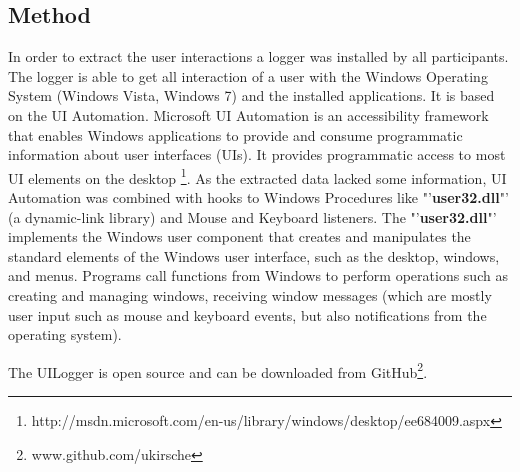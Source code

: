 \subsection{Method}
\label{habits_method}
In order to extract the user interactions a logger was installed by all participants. The logger is able to get all interaction of a user with the Windows Operating System (Windows Vista, Windows 7) and the installed applications. It is based on the UI Automation. Microsoft UI Automation is an accessibility framework that enables Windows applications to provide and consume programmatic information about user interfaces (UIs). It provides programmatic access to most UI elements on the desktop \footnote{http://msdn.microsoft.com/en-us/library/windows/desktop/ee684009.aspx}. As the extracted data lacked some information, UI Automation was combined with hooks to Windows Procedures like "'\textbf{user32.dll}"' (a dynamic-link library) and Mouse and Keyboard listeners. The "'\textbf{user32.dll}"' implements the Windows user component that creates and manipulates the standard elements of the Windows user interface, such as the desktop, windows, and menus. Programs call functions from Windows to perform operations such as creating and managing windows, receiving window messages (which are mostly user input such as mouse and keyboard events, but also notifications from the operating system). 

The UILogger is open source and can be downloaded from GitHub\footnote{www.github.com/ukirsche}. 


